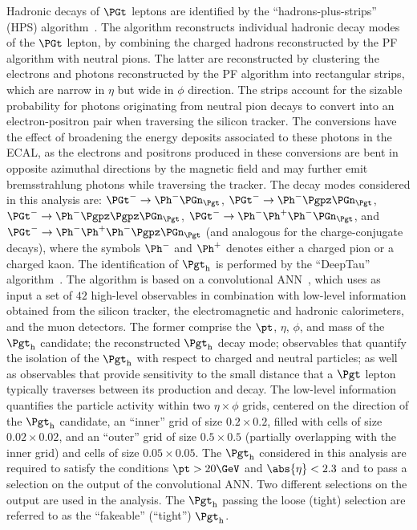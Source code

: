 Hadronic decays of $\PGt$ leptons are identified by the ``hadrons-plus-strips'' (HPS) algorithm~\cite{Sirunyan:2018pgf}.
The algorithm reconstructs individual hadronic decay modes of the $\PGt$ lepton,
by combining the charged hadrons reconstructed by the PF algorithm with neutral pions.
The latter are reconstructed by clustering the electrons and photons reconstructed by the PF algorithm into rectangular strips,
which are narrow in $\eta$ but wide in $\phi$ direction.
The strips account for the sizable probability for photons originating from neutral pion decays
to convert into an electron-positron pair when traversing the silicon tracker.
The conversions have the effect of broadening the energy deposits associated to these photons in the ECAL,
as the electrons and positrons produced in these conversions are bent in opposite azimuthal directions by the magnetic field
and may further emit bremsstrahlung photons while traversing the tracker.
The decay modes considered in this analysis are:
$\PGt^{-} \to \Ph^{-}\Pnut$, $\PGt^{-} \to \Ph^{-}\Ppizero\Pnut$, $\PGt^{-} \to \Ph^{-}\Ppizero\Ppizero\Pnut$, 
$\PGt^{-} \to \Ph^{-}\Ph^{+}\Ph^{-}\Pnut$, and $\PGt^{-} \to \Ph^{-}\Ph^{+}\Ph^{-}\Ppizero\Pnut$
(and analogous for the charge-conjugate decays),
where the symbols $\Ph^{-}$ and $\Ph^{+}$ denotes either a charged pion or a charged kaon.
The identification of $\tauh$ is performed by the ``DeepTau'' algorithm~\cite{CMS-DP-2019-033}.
The algorithm is based on a convolutional ANN~\cite{lecun1989},
which uses as input a set of $42$ high-level observables in combination with low-level information obtained from the silicon tracker, the electromagnetic and hadronic calorimeters, and the muon detectors.
The former comprise the $\pt$, $\eta$, $\phi$, and mass of the $\tauh$ candidate; the reconstructed $\tauh$ decay mode;
observables that quantify the isolation of the $\tauh$ with respect to charged and neutral particles;
as well as observables that provide sensitivity to the small distance that a $\Pgt$ lepton typically traverses between its production and decay.
The low-level information quantifies the particle activity within two $\eta \times \phi$ grids, centered on the direction of the $\tauh$ candidate,
an ``inner'' grid of size $0.2 \times 0.2$, filled with cells of size $0.02 \times 0.02$,
and an ``outer'' grid of size $0.5 \times 0.5$ (partially overlapping with the inner grid) and cells of size $0.05 \times 0.05$.
The $\tauh$ considered in this analysis are required to satisfy the conditions $\pt > 20\GeV$ and $\abs{\eta} < 2.3$ 
and to pass a selection on the output of the convolutional ANN.
Two different selections on the output are used in the analysis.
The $\tauh$ passing the loose (tight) selection are referred to as the ``fakeable'' (``tight'') $\tauh$.

